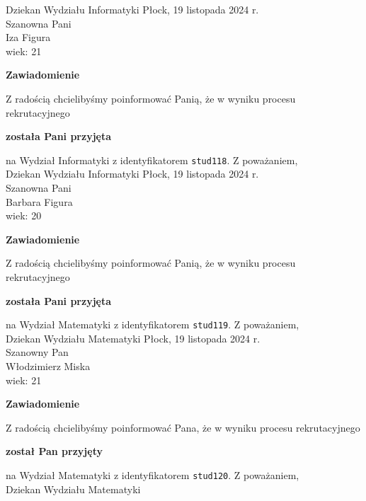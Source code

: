 \documentclass[12pt,a4paper]{article}
\begin{document}
Dziekan
Wydziału Informatyki
\newpage
\hfill Płock, 19 listopada 2024 r. \\
\noindent
Szanowna Pani \\
Iza Figura \\
wiek: 21
\bigskip
\begin{center}
    {\Large\textbf{Zawiadomienie}}
\end{center}
\bigskip 
Z radością chcielibyśmy poinformować Panią, że w wyniku procesu rekrutacyjnego
\begin{center}
\textsf{\textbf{została Pani przyjęta}}
\end{center}
na Wydział Informatyki z identyfikatorem \verb|stud118|. 
\vspace{2cm}
\noindent
Z poważaniem, \\
Dziekan
Wydziału Informatyki
\newpage
\hfill Płock, 19 listopada 2024 r. \\
\noindent
Szanowna Pani \\
Barbara Figura \\
wiek: 20
\bigskip
\begin{center}
    {\Large\textbf{Zawiadomienie}}
\end{center}
\bigskip 
Z radością chcielibyśmy poinformować Panią, że w wyniku procesu rekrutacyjnego
\begin{center}
\textsf{\textbf{została Pani przyjęta}}
\end{center}
na Wydział Matematyki z identyfikatorem \verb|stud119|. 
\vspace{2cm}
\noindent
Z poważaniem, \\
Dziekan
Wydziału Matematyki
\newpage
\hfill Płock, 19 listopada 2024 r. \\
\noindent
Szanowny Pan \\
Włodzimierz Miska \\
wiek: 21
\bigskip
\begin{center}
    {\Large\textbf{Zawiadomienie}}
\end{center}
\bigskip 
Z radością chcielibyśmy poinformować Pana, że w wyniku procesu rekrutacyjnego
\begin{center}
\textsf{\textbf{został Pan przyjęty}}
\end{center}
na Wydział Matematyki z identyfikatorem \verb|stud120|. 
\vspace{2cm}
\noindent
Z poważaniem, \\
Dziekan
Wydziału Matematyki
\newpage
\end{document}
